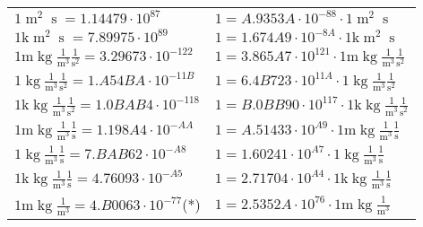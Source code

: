 \begin{center}
\begin{longtable}{l l}
{\color{black}$1 \bm{\mathrm{ }}{\operatorname{m}^2}{\operatorname{s}}{}{} = 1.14479\cdot10^{87} $}   & {\color{black}$ 1 = A.9353A\cdot10^{-88} \cdot 1 \bm{\mathrm{ }}{\operatorname{m}^2}{\operatorname{s}}{}{}$}  \\
{\color{gray}$1 \bm{\mathrm{ k}}{\operatorname{m}^2}{\operatorname{s}}{}{} = 7.89975\cdot10^{89} $}   & {\color{gray}$ 1 = 1.674A9\cdot10^{-8A} \cdot 1 \bm{\mathrm{ k}}{\operatorname{m}^2}{\operatorname{s}}{}{}$}  \\
\hline{\color{gray}$1 \bm{\mathrm{ m}}\operatorname{kg}\frac1{\operatorname{m}^3}\frac1{\operatorname{s}^2}{}{} = 3.29673\cdot10^{-122} $}   & {\color{gray}$ 1 = 3.865A7\cdot10^{121} \cdot 1 \bm{\mathrm{ m}}\operatorname{kg}\frac1{\operatorname{m}^3}\frac1{\operatorname{s}^2}{}{}$}  \\
{\color{black}$1 \bm{\mathrm{ }}\operatorname{kg}\frac1{\operatorname{m}^3}\frac1{\operatorname{s}^2}{}{} = 1.A54BA\cdot10^{-11B} $}   & {\color{black}$ 1 = 6.4B723\cdot10^{11A} \cdot 1 \bm{\mathrm{ }}\operatorname{kg}\frac1{\operatorname{m}^3}\frac1{\operatorname{s}^2}{}{}$}  \\
{\color{gray}$1 \bm{\mathrm{ k}}\operatorname{kg}\frac1{\operatorname{m}^3}\frac1{\operatorname{s}^2}{}{} = 1.0BAB4\cdot10^{-118} $}   & {\color{gray}$ 1 = B.0BB90\cdot10^{117} \cdot 1 \bm{\mathrm{ k}}\operatorname{kg}\frac1{\operatorname{m}^3}\frac1{\operatorname{s}^2}{}{}$}  \\
{\color{gray}$1 \bm{\mathrm{ m}}\operatorname{kg}\frac1{\operatorname{m}^3}\frac1{\operatorname{s}}{}{} = 1.198A4\cdot10^{-AA} $}   & {\color{gray}$ 1 = A.51433\cdot10^{A9} \cdot 1 \bm{\mathrm{ m}}\operatorname{kg}\frac1{\operatorname{m}^3}\frac1{\operatorname{s}}{}{}$}  \\
{\color{black}$1 \bm{\mathrm{ }}\operatorname{kg}\frac1{\operatorname{m}^3}\frac1{\operatorname{s}}{}{} = 7.BAB62\cdot10^{-A8} $}   & {\color{black}$ 1 = 1.60241\cdot10^{A7} \cdot 1 \bm{\mathrm{ }}\operatorname{kg}\frac1{\operatorname{m}^3}\frac1{\operatorname{s}}{}{}$}  \\
{\color{gray}$1 \bm{\mathrm{ k}}\operatorname{kg}\frac1{\operatorname{m}^3}\frac1{\operatorname{s}}{}{} = 4.76093\cdot10^{-A5} $}   & {\color{gray}$ 1 = 2.71704\cdot10^{A4} \cdot 1 \bm{\mathrm{ k}}\operatorname{kg}\frac1{\operatorname{m}^3}\frac1{\operatorname{s}}{}{}$}  \\
{\color{gray}$1 \bm{\mathrm{ m}}\operatorname{kg}\frac1{\operatorname{m}^3}{}{}{} = 4.B0063\cdot10^{-77} $}\quad(*) & {\color{gray}$ 1 = 2.5352A\cdot10^{76} \cdot 1 \bm{\mathrm{ m}}\operatorname{kg}\frac1{\operatorname{m}^3}{}{}{}$}  \\

\end{longtable}
\end{center}
